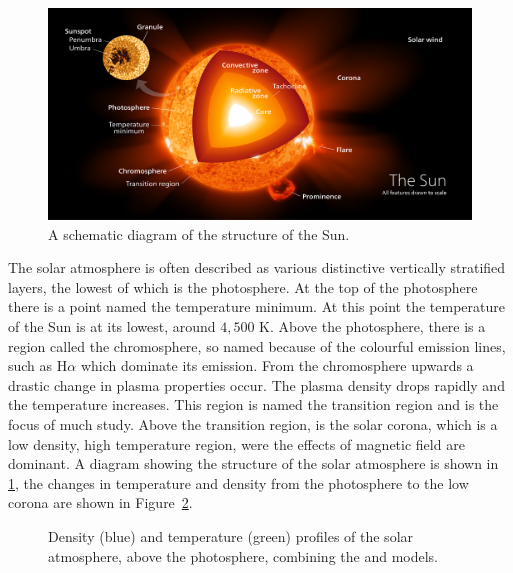\documentclass[a4paper,12pt,fourier,authoryear,custommargin]{Classes/PhDThesisPSnPDF}
\providecommand{\DIFaddtex}[1]{{\protect\color{blue}\uwave{#1}}} %
\providecommand{\DIFaddFL}[1]{\DIFadd{#1}} %
\providecommand{\DIFaddbeginFL}{} %
\providecommand{\DIFaddendFL}{} %
\providecommand{\DIFadd}[1]{\texorpdfstring{\DIFaddtex{#1}}{#1}} %
\begin{document}
\begin{figure}[h]
\centering
\includegraphics[width=0.9\linewidth]{Chapter1/Figs/Sun_poster}
\caption{A schematic diagram of the structure of the Sun. \citep{kelvinsong2015}}
\label{fig:sun_poster}
\end{figure}


The solar atmosphere is often described as various distinctive vertically stratified layers, the lowest of which is the photosphere.
At the top of the photosphere there is a point named the temperature minimum.
At this point the temperature of the Sun is at its lowest, around $4,500$ K.
Above the photosphere, there is a region called the chromosphere, so named because of the colourful emission lines, such as H$\alpha$ which dominate its emission.
From the chromosphere upwards a drastic change in plasma properties occur.
The plasma density drops rapidly and the temperature increases.
This region is named the transition region and is the focus of much study.
Above the transition region, is the solar corona, which is a low density, high temperature region, were the effects of magnetic field are dominant.
A diagram showing the structure of the solar atmosphere is shown in \cref{fig:sun_poster}, the changes in temperature and density from the photosphere to the low corona are shown in Figure~\ref{fig:atmos}.



\begin{figure}[h]
    \centering
    \caption{Density (blue) and temperature (green) profiles of the solar atmosphere, above the photosphere, combining the \cite{mcwhirter1975} and \cite{vernazza1981} \DIFaddbeginFL \DIFaddFL{semi-empirical }\DIFaddendFL models.}
    \label{fig:atmos}
\end{figure}
\end{document}
